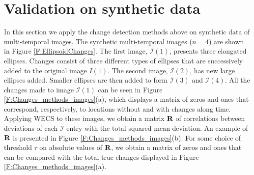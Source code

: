 \documentclass[journal]{IEEEtran}
\newcommand{\vR}{{\textbf R}}
\begin{document}
\section{Validation on synthetic data}\label{section_validation}

In this section we apply the change detection methods above on synthetic data of multi-temporal images. 
The synthetic multi-temporal images ($n=4$) are shown in Figure \ref{F:EllipsoidChanges}. The first image, $\mathcal{I}(1)$, presents three elongated ellipses. Changes consist of three different types of ellipses that are successively added to the original image $I(1)$. The second image, $\mathcal{I}(2)$, has new large ellipses added. Smaller ellipses are then added to form $\mathcal{I}(3)$ and $\mathcal{I}(4)$. All the changes made to image $\mathcal{I}(1)$ can be seen in Figure \ref{F:Changes_methods_images}(a), which displays a matrix of zeros and ones that correspond, respectively, to locations without and with changes along time. Applying WECS to these images, we obtain a matrix $\vR$ of correlations between deviations of each $\mathcal{I}$ entry with the total squared mean deviation. An example of $\vR$ is presented in Figure \ref{F:Changes_methods_images}(b). For some choice of threshold $\tau$ on absolute values of $\vR$, we obtain a matrix of zeros and ones that can be compared with the total true changes displayed in Figure \ref{F:Changes_methods_images}(a).
\end{document}
